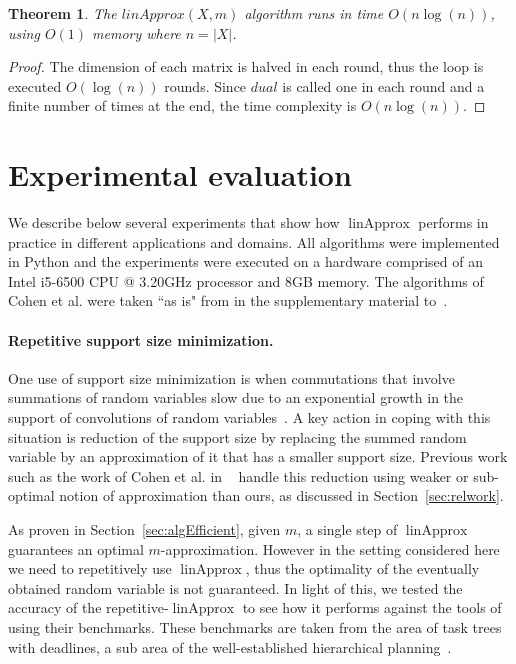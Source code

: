 \documentclass[letterpaper]{article} %
\newtheorem{theorem}[thm]{Theorem}
\DeclareMathOperator{\KlmApprox}{linApprox}
\begin{document}
\begin{theorem}\label{the:complexityLinear}
	The $linApprox(X,m)$ algorithm runs in time $O(n \log(n))$, using $O(1)$ memory where $n=|X|$.
\end{theorem}
\begin{proof}
The dimension of each matrix is halved in each round, thus the loop is executed $O(\log(n))$ rounds. Since $dual$ is called one in each round and a finite number of times at the end, the time complexity is $O(n \log(n))$.
\end{proof}


\section{Experimental evaluation}\label{sec:exp}

We describe below several experiments that show how $\KlmApprox$ performs in practice in different applications and domains.
All algorithms were implemented in Python and the experiments were executed on a hardware comprised of an Intel i5-6500 CPU @ 3.20GHz processor and 8GB memory. The algorithms of Cohen et al. were taken ``as is" from in the supplementary material to~\cite{cohen2015estimating}.

\paragraph{Repetitive support size minimization.} One use of support size minimization is when commutations that involve summations of random variables slow due to an exponential growth in the support of convolutions of random variables~\cite{cohen2015estimating}. A key action in coping with this situation is reduction of the  support size by replacing the summed random variable by an approximation of it that has a smaller support size. Previous work such as the work of Cohen et al. in ~ handle this reduction using weaker or sub-optimal notion of approximation than ours, as discussed in Section~\ref{sec:relwork}. 

As proven in Section~\ref{sec:algEfficient}, given $m$, a single step of $\KlmApprox$ guarantees an optimal $m$-approximation. However in the setting considered here we need to repetitively use $\KlmApprox$, thus the optimality of the eventually obtained random variable is not guaranteed. In light of this, we tested the accuracy of the repetitive-$\KlmApprox$ to see how it performs against the tools of~\cite{cohen2015estimating,CohenGW18} using their benchmarks. These benchmarks are taken from the area of task trees with deadlines, a sub area of the well-established hierarchical planning~\cite{thomas1988hierarchical,alford2016hierarchical,xiao2017hierarchical}.
\end{document}
